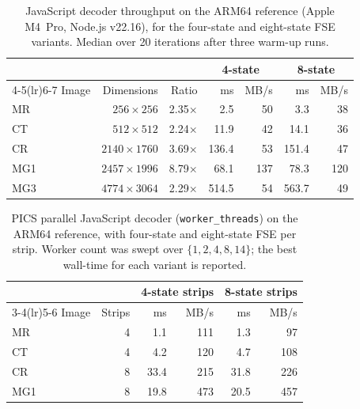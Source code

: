 \documentclass[journal]{IEEEtran}
\begin{document}
\begin{table}[htbp]
\centering
\caption{JavaScript decoder throughput on the ARM64 reference (Apple
M4~Pro, Node.js v22.16), for the four-state and eight-state FSE
variants. Median over 20 iterations after three warm-up runs.}
\label{tab:js-perf}
\begin{tabular}{lrrrrrr}
\toprule
 & & & \multicolumn{2}{c}{4-state} & \multicolumn{2}{c}{8-state} \\
\cmidrule(lr){4-5}\cmidrule(lr){6-7}
Image & Dimensions & Ratio & ms & MB/s & ms & MB/s \\
\midrule
MR  & $256{\times}256$   & 2.35$\times$ &   2.5 &  50 &   3.3 &  38 \\
CT  & $512{\times}512$   & 2.24$\times$ &  11.9 &  42 &  14.1 &  36 \\
CR  & $2140{\times}1760$ & 3.69$\times$ & 136.4 &  53 & 151.4 &  47 \\
MG1 & $2457{\times}1996$ & 8.79$\times$ &  68.1 & 137 &  78.3 & 120 \\
MG3 & $4774{\times}3064$ & 2.29$\times$ & 514.5 &  54 & 563.7 &  49 \\
\bottomrule
\end{tabular}
\end{table}

\begin{table}[htbp]
\centering
\caption{PICS parallel JavaScript decoder (\texttt{worker\_threads}) on
the ARM64 reference, with four-state and eight-state FSE per strip.
Worker count was swept over $\{1,2,4,8,14\}$; the best wall-time for
each variant is reported.}
\label{tab:pics-js}
\begin{tabular}{lrrrrr}
\toprule
 & & \multicolumn{2}{c}{4-state strips} & \multicolumn{2}{c}{8-state strips} \\
\cmidrule(lr){3-4}\cmidrule(lr){5-6}
Image & Strips &   ms & MB/s &   ms & MB/s \\
\midrule
MR  & 4 &   1.1 & 111 &   1.3 &  97 \\
CT  & 4 &   4.2 & 120 &   4.7 & 108 \\
CR  & 8 &  33.4 & 215 &  31.8 & 226 \\
MG1 & 8 &  19.8 & 473 &  20.5 & 457 \\
\bottomrule
\end{tabular}
\end{table}
\end{document}
